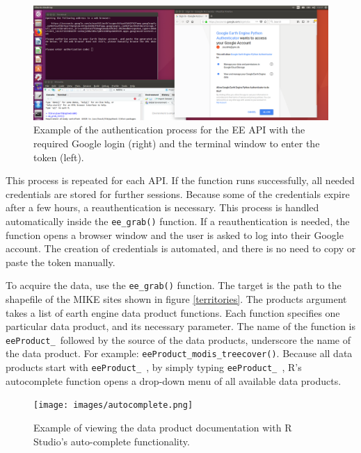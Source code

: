 \begin{center}
	\begin{figure}[h]
		\begin{center}
			\includegraphics[width=15cm]{images/install_authentication.png}
			\caption{Example of the authentication process for the EE API with the required Google login (right) and the terminal window to enter the token (left).}
			\label{install}
		\end{center}
	\end{figure}
\end{center}



This process is repeated for each API. If the function runs successfully, all needed credentials are stored for further sessions. Because some of the credentials expire after a few hours, a reauthentication is necessary. This process is handled automatically inside the \texttt{ee\_grab()} function. If a reauthentication is needed, the function opens a browser window and the user is asked to log into their Google account. The creation of credentials is automated, and there is no need to copy or paste the token manually.

To acquire the data, use the \texttt{ee\_grab()} function. The target is the path to the shapefile of the MIKE sites shown in figure \ref{territories}. The products argument takes a list of earth engine data product functions. Each function specifies one particular data product, and its necessary parameter. The name of the function is \texttt{eeProduct\_ }followed by the source of the data products, underscore the name of the data product. For example: \texttt{eeProduct\_modis\_treecover()}. Because all data products start with \texttt{eeProduct\_ }, by simply typing \texttt{eeProduct\_ }, R's autocomplete function opens a drop-down menu of all available data products. 

\begin{center}
	\begin{figure}[h]
		\begin{center}
			\texttt{[image: images/autocomplete.png]}
			\caption{Example of viewing the data product documentation with R Studio's auto-complete functionality.}
			\label{install}
		\end{center}
	\end{figure}
\end{center}



